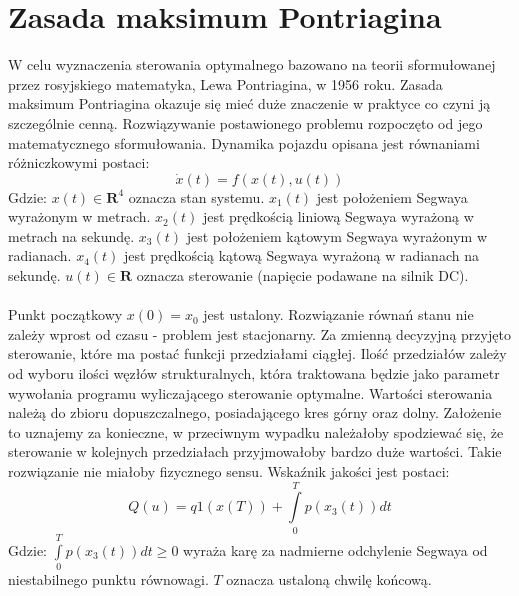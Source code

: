 \section{Zasada maksimum Pontriagina}
\label{sec:zasada_max}

W celu wyznaczenia sterowania optymalnego bazowano na teorii sformułowanej przez rosyjskiego matematyka, Lewa Pontriagina, w 1956 roku. Zasada maksimum Pontriagina okazuje się mieć duże znaczenie w praktyce co czyni ją szczególnie cenną. Rozwiązywanie postawionego problemu rozpoczęto od jego matematycznego sformułowania. Dynamika pojazdu opisana jest równaniami różniczkowymi postaci:
\begin{equation}
\dot{x}(t)=f(x(t),u(t))
\end{equation}
\noindent Gdzie:\newline
$x(t)\in\textbf{R}^{4}$ oznacza stan systemu.\newline
$x_1(t)$ jest położeniem Segwaya wyrażonym w metrach.\newline
$x_2(t)$ jest prędkością liniową Segwaya wyrażoną w metrach na sekundę.\newline
$x_3(t)$ jest położeniem kątowym Segwaya wyrażonym w radianach.\newline
$x_4(t)$ jest prędkością kątową Segwaya wyrażoną w radianach na sekundę.\newline
$u(t)\in\textbf{R}$ oznacza sterowanie (napięcie podawane na silnik DC).\newline
\paragraph*{}
Punkt początkowy $x(0)=x_0$ jest ustalony. Rozwiązanie równań stanu nie zależy wprost od czasu - problem jest stacjonarny. Za zmienną decyzyjną przyjęto sterowanie, które ma postać funkcji przedziałami ciągłej. Ilość przedziałów zależy od wyboru ilości węzłów strukturalnych, która traktowana będzie jako parametr wywołania programu wyliczającego sterowanie optymalne. Wartości sterowania należą do zbioru dopuszczalnego, posiadającego kres górny oraz dolny. Założenie to uznajemy za konieczne, w przeciwnym wypadku należałoby spodziewać się, że sterowanie w kolejnych przedziałach przyjmowałoby bardzo duże wartości. Takie rozwiązanie nie miałoby fizycznego sensu. Wskaźnik jakości jest postaci:
\begin{equation}
Q(u)=q1(x(T))+\int\limits_{0}^{T}p(x_3(t))dt
\end{equation}
\noindent Gdzie:\newline
\(\int\limits_{0}^{T}p(x_3(t))dt\geq0\) wyraża karę za nadmierne odchylenie Segwaya od niestabilnego punktu równowagi.\newline
\(T\) oznacza ustaloną chwilę końcową.
